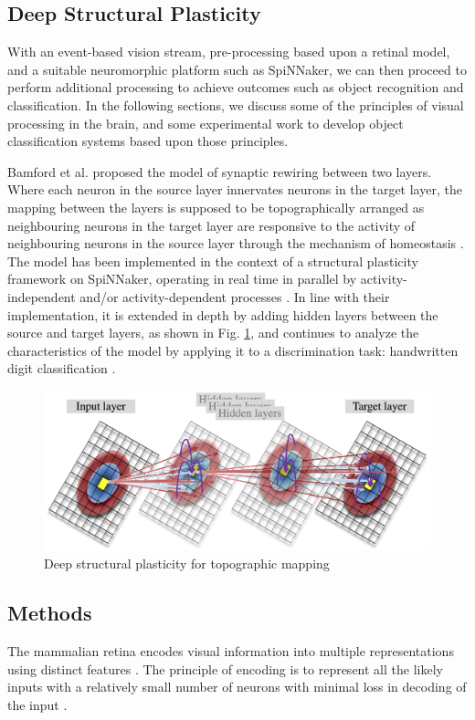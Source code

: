 \documentclass[letterpaper, 10 pt, conference]{ieeeconf}  %
\begin{document}
\subsection{Deep Structural Plasticity}

With an event-based vision stream, pre-processing based upon a retinal model, and a suitable neuromorphic platform such as SpiNNaker, we can then proceed to perform additional processing to achieve outcomes such as object recognition and classification. In the following sections, we discuss some of the principles of visual processing in the brain, and some experimental work to develop object classification systems based upon those principles.

Bamford et al. \cite{bamford2010synaptic} proposed the model of synaptic rewiring between two layers. 
Where each neuron in the source layer innervates neurons in the target layer, the mapping between the layers is supposed to be topographically arranged as neighbouring neurons in the target layer are responsive to the activity of neighbouring neurons in the source layer \cite{udin1988formation} through the mechanism of homeostasis \cite{Butz2009}. 
The model has been implemented in the context of a structural plasticity framework on SpiNNaker, operating in real time in parallel by activity-independent and/or activity-dependent processes \cite{bogdan2018structural}.
In line with their implementation, it is extended in depth by adding hidden layers between the source and target layers, as shown in Fig. \ref{fig:dsp}, and continues to analyze the characteristics of the model by applying it to a discrimination task: handwritten digit classification \cite{hopkins2018spiking}.

\begin{figure}[tbh]
    \centering
    \includegraphics[width=0.90\linewidth, trim=0cm 0cm 0cm 0cm, clip=true]{DSP_n}
    \caption{Deep structural plasticity for topographic mapping}
    \label{fig:dsp}
\end{figure}

\subsection{Methods}
The mammalian retina encodes visual information into multiple representations using distinct features \cite{roska2014retina}. 
The principle of encoding is to represent all the likely inputs with a relatively small number of neurons with minimal loss in decoding of the input \cite{field1994goal}. 
\end{document}
